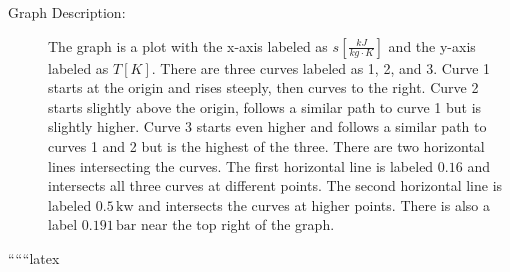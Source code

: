\begin{description}
    \item[Graph Description:] The graph is a plot with the x-axis labeled as $s \left[ \frac{kJ}{kg \cdot K} \right]$ and the y-axis labeled as $T \left[ K \right]$. There are three curves labeled as 1, 2, and 3. Curve 1 starts at the origin and rises steeply, then curves to the right. Curve 2 starts slightly above the origin, follows a similar path to curve 1 but is slightly higher. Curve 3 starts even higher and follows a similar path to curves 1 and 2 but is the highest of the three. There are two horizontal lines intersecting the curves. The first horizontal line is labeled $0.16$ and intersects all three curves at different points. The second horizontal line is labeled $0.5 \, \text{kw}$ and intersects the curves at higher points. There is also a label $0.191 \, \text{bar}$ near the top right of the graph.
\end{description}

``````latex


